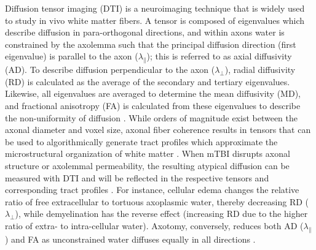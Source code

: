 \documentclass[12pt]{article}
\begin{document}
Diffusion tensor imaging (DTI) is a neuroimaging technique that is widely used to study in vivo white matter fibers. A tensor is composed of eigenvalues which describe diffusion in para-orthogonal directions, and within axons water is constrained by the axolemma such that the principal diffusion direction (first eigenvalue) is parallel to the axon ($\lambda_\parallel$); this is referred to as axial diffusivity (AD). To describe diffusion perpendicular to the axon ($\lambda_\perp$), radial diffusivity (RD) is calculated as the average of the secondary and tertiary eigenvalues. Likewise, all eigenvalues are averaged to determine the mean diffusivity (MD), and fractional anisotropy (FA) is calculated from these eigenvalues to describe the non-uniformity of diffusion \parencite{mori1999ThreedimensionalTrackingAxonal,lilja2014VisualizingMeyersLoop,lindsey2023DiffusionWeightedImagingMild}. While orders of magnitude exist between the axonal diameter and voxel size, axonal fiber coherence results in tensors that can be used to algorithmically generate tract profiles which approximate the microstructural organization of white matter \parencite{kiselev2021MicrostructureDiffusionMRI,novikov2019QuantifyingBrainMicrostructure,danielian2010ReliabilityFiberTracking,reid2022TractspecificStatisticsBased,sarwar2019MappingConnectomesDiffusion,tournier2007RobustDeterminationFibre}. When mTBI disrupts axonal structure or axolemmal permeability, the resulting atypical diffusion can be measured with DTI and will be reflected in the respective tensors and corresponding tract profiles \parencite{macdonald2007DetectionTraumaticAxonal,macdonald2007DiffusionTensorImaging}. For instance, cellular edema changes the relative ratio of free extracellular to tortuous axoplasmic water, thereby decreasing RD ($\lambda_\perp$), while demyelination has the reverse effect (increasing RD due to the higher ratio of extra- to intra-cellular water). Axotomy, conversely, reduces both AD ($\lambda_\parallel$) and FA as unconstrained water diffuses equally in all directions \parencite{rosenblum2007CytotoxicEdemaMonitoring,liang2007CytotoxicEdemaMechanisms,borja2018DiffusionMRImaging,barkhoudarian2016MolecularPathophysiologyConcussive,pettus1996CharacterizationDistinctSet}.
\end{document}
